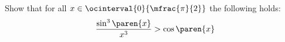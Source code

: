 Show that for all $x \in \ocinterval{0}{\mfrac{\pi}{2}}$ the following holds:
\begin{equation*}
  \frac{\sin^{3}\paren{x}}{x^3}
  > \cos\paren{x}
\end{equation*}
